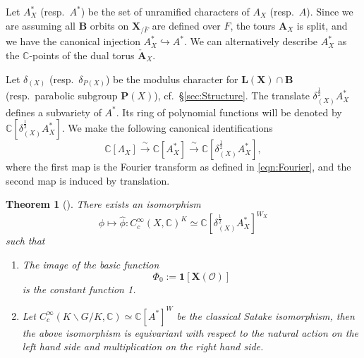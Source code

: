 \documentclass{amsart}
\newtheorem{theorem}{Theorem}[section]
\theoremstyle{definition}
\theoremstyle{remark}
\newcommand{\1}{\mathbf{1}}
\newcommand{\C}{\mathbb{C}}
\newcommand{\iso}{\xrightarrow{\,\sim\,}}
\newcommand{\mb}[1]{\mathbf{#1}}
\newcommand{\Or}{\mathcal{O}}
\theoremstyle{definition}
\newcommand{\indf}{\mathbf{1}}
\begin{document}
Let $A_X^*$ (resp.~$A^*$) be the set of unramified characters of $A_X$ (resp.~$A$). Since we are assuming all $\mb{B}$ orbits on $\mb{X}_{/\bar{F}}$ are defined over $F$, the tours $\mb{A}_X$ is split, and we have the canonical injection $A_X^*\hookrightarrow A^*$. We can alternatively describe $A_X^*$ as the $\C$-points of the dual torus $\check{\mb{A}}_X$.

Let $\delta_{(X)}$ (resp.~$\delta_{P(X)}$) be the modulus character for  $\mb{L}(\mb{X})\cap \mb{B}$ (resp.~parabolic subgroup $\mb{P}(X)$), cf.~\S\ref{sec:Structure}. The translate $\delta_{(X)}^{\frac{1}{2}}A_X^*$ defines a subvariety of $A^*$. Its ring of polynomial functions will be denoted by $\C[\delta_{(X)}^{\frac{1}{2}}A_X^*]$. We make the following canonical identifications
\begin{equation}\label{eqn:Shift}
    \C[\Lambda_X]\iso\C[A_X^*]\iso\C[\delta_{(X)}^{\frac{1}{2}}A_X^*],
\end{equation}
where the first map is the Fourier transform as defined in \eqref{eqn:Fourier}, and the second map is induced by translation.
\begin{theorem}[{\cite[Theorem 8.0.2]{SakSpherical}}]\label{thm:RelSatake}
  There exists an isomorphism
  \[
    \phi\mapsto\hat{\phi}:C_c^\infty(X,\C)^K\simeq\C[\delta_{(X)}^{\frac{1}{2}}A_X^*]^{W_X}
  \]
  such that
  \begin{enumerate}
    \item The image of the basic function
    \[
        \Phi_0:=\indf[\mb{X}(\Or)]
    \]
    is the constant function 1.
    \item Let $C_c^\infty(K\backslash G/K,\C)\simeq\C[A^*]^W$ be the classical Satake isomorphism, then the above isomorphism is equivariant with respect to the natural action on the left hand side and multiplication on the right hand side.
  \end{enumerate}
\end{theorem}
\end{document}
